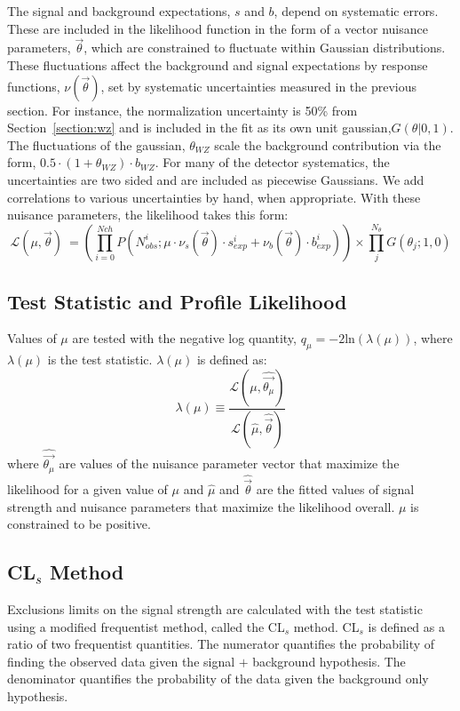 The signal and background expectations, $s$ and $b$, depend on systematic errors. These are included in the likelihood function in the form of a vector nuisance parameters, $\vec{\theta}$, which are constrained to fluctuate within Gaussian distributions. These fluctuations affect the background and signal expectations by response functions, $\nu(\vec{\theta})$, set by systematic uncertainties measured in the previous section. For instance, the \WZ normalization uncertainty is 50\% from Section~\ref{section:wz} and is included in the fit as its own unit gaussian,$G(\theta|0,1)$. The fluctuations of the gaussian, $\theta_{WZ}$ scale the background contribution via the form, $0.5\cdot(1+\theta_{WZ})\cdot b_{WZ}$. For many of the detector systematics, the uncertainties are two sided and are included as piecewise Gaussians. We add correlations to various uncertainties by hand, when appropriate. With these nuisance parameters, the likelihood takes this form:
\begin{equation}
\mathcal{L}(\mu,\vec{\theta})\ =  \left( \prod_{i=0}^{N{ch}} P(N_{obs}^{i}; \mu \cdot \nu_{s}(\vec{\theta})\cdot s_{exp}^{i} + \nu_{b}(\vec{\theta})\cdot b_{exp}^{i}) \right) \times \prod_{j}^{N_{\theta}}G(\theta_j; 1,0)
\end{equation}


\subsection{Test Statistic and Profile Likelihood}

Values of $\mu$ are tested with the negative log quantity, $q_{\mu}= -2$ln$(\lambda(\mu))$, where $\lambda(\mu)$ is the test statistic.
$\lambda(\mu)$ is defined as:
\begin{equation}
\lambda(\mu) \equiv \frac{\mathcal{L}(\mu,\hat{\vec{\theta_{\mu}}})}{\mathcal{L}(\hat{\mu},\hat{\vec{\theta}})}
\end{equation}
where $\hat{\vec{\theta_{\mu}}}$ are values of the nuisance parameter vector that maximize the likelihood for a given value of $\mu$ and $\hat{\mu}$ and $\hat{\vec{\theta}}$ are the fitted values of signal strength and nuisance parameters that maximize the likelihood overall. $\mu$ is constrained to be positive.  

\subsection{ CL$_{s}$ Method}

Exclusions limits on the signal strength are calculated with the test statistic using a modified frequentist method, called the CL$_{s}$ method\cite{0954-3899-28-10-313}. CL$_{s}$ is defined as a ratio of two frequentist quantities. The numerator quantifies the probability of finding the observed data given the signal $+$ background hypothesis. The denominator quantifies the probability of the data given the background only hypothesis.

